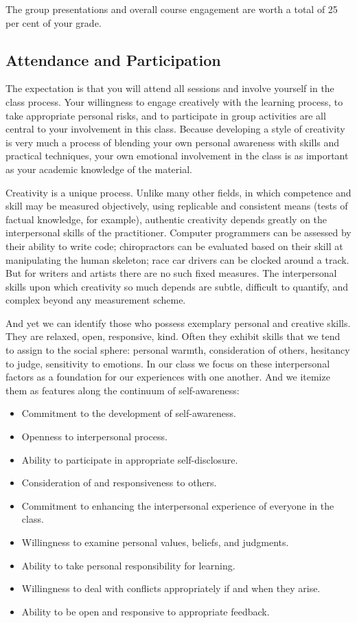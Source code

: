 \documentclass[letterpaper,10pt,headsepline]{scrreprt}
\begin{document}
The group presentations and overall course engagement are worth a total of 25 per cent of your grade.

\subsection{Attendance and Participation}
The expectation is that you will attend all sessions and involve yourself in the class process. Your willingness to engage creatively with the learning process, to take appropriate personal risks, and to participate in group activities are all central to your involvement in this class. Because developing a style of creativity is very much a process of blending your own personal awareness with skills and practical techniques, your own emotional involvement in the class is as important as your academic knowledge of the material.

Creativity is a unique process. Unlike many other fields, in which competence and skill may be measured objectively, using replicable and consistent means (tests of factual knowledge, for example), authentic creativity depends greatly on the interpersonal skills of the practitioner. Computer programmers can be assessed by their ability to write code; chiropractors can be evaluated based on their skill at manipulating the human skeleton; race car drivers can be clocked around a track. But for writers and artists there are no such fixed measures. The interpersonal skills upon which creativity so much depends are subtle, difficult to quantify, and complex beyond any measurement scheme.

And yet we can identify those who possess exemplary personal and creative skills. They are relaxed, open, responsive, kind. Often they exhibit skills that we tend to assign to the social sphere: personal warmth, consideration of others, hesitancy to judge, sensitivity to emotions. In our class we focus on these interpersonal factors as a foundation for our experiences with one another. And we itemize them as features along the continuum of self-awareness:

\begin{itemize}
\item Commitment to the development of self-awareness.
\item Openness to interpersonal process.
\item Ability to participate in appropriate self-disclosure.
\item Consideration of and responsiveness to others.
\item Commitment to enhancing the interpersonal experience of everyone in the class.
\item Willingness to examine personal values, beliefs, and judgments.
\item Ability to take personal responsibility for learning.
\item Willingness to deal with conflicts appropriately if and when they arise.
\item Ability to be open and responsive to appropriate feedback.
\end{itemize}
\end{document}
